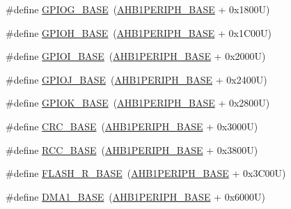 \begin{DoxyCompactItemize}
\item 
\#define \hyperlink{group___peripheral__memory__map_ga5d8ca4020f2e8c00bde974e8e7c13cfe}{G\+P\+I\+O\+G\+\_\+\+B\+A\+SE}~(\hyperlink{group___peripheral__memory__map_ga811a9a4ca17f0a50354a9169541d56c4}{A\+H\+B1\+P\+E\+R\+I\+P\+H\+\_\+\+B\+A\+SE} + 0x1800\+U)
\item 
\#define \hyperlink{group___peripheral__memory__map_gaee4716389f3a1c727495375b76645608}{G\+P\+I\+O\+H\+\_\+\+B\+A\+SE}~(\hyperlink{group___peripheral__memory__map_ga811a9a4ca17f0a50354a9169541d56c4}{A\+H\+B1\+P\+E\+R\+I\+P\+H\+\_\+\+B\+A\+SE} + 0x1\+C00\+U)
\item 
\#define \hyperlink{group___peripheral__memory__map_ga50acf918c2e1c4597d5ccfe25eb3ad3d}{G\+P\+I\+O\+I\+\_\+\+B\+A\+SE}~(\hyperlink{group___peripheral__memory__map_ga811a9a4ca17f0a50354a9169541d56c4}{A\+H\+B1\+P\+E\+R\+I\+P\+H\+\_\+\+B\+A\+SE} + 0x2000\+U)
\item 
\#define \hyperlink{group___peripheral__memory__map_ga73f5a4e42f41acc614ee82c8ebfe0b85}{G\+P\+I\+O\+J\+\_\+\+B\+A\+SE}~(\hyperlink{group___peripheral__memory__map_ga811a9a4ca17f0a50354a9169541d56c4}{A\+H\+B1\+P\+E\+R\+I\+P\+H\+\_\+\+B\+A\+SE} + 0x2400\+U)
\item 
\#define \hyperlink{group___peripheral__memory__map_ga46d3f8cd7c045b5e13cd7395b8e936e5}{G\+P\+I\+O\+K\+\_\+\+B\+A\+SE}~(\hyperlink{group___peripheral__memory__map_ga811a9a4ca17f0a50354a9169541d56c4}{A\+H\+B1\+P\+E\+R\+I\+P\+H\+\_\+\+B\+A\+SE} + 0x2800\+U)
\item 
\#define \hyperlink{group___peripheral__memory__map_ga656a447589e785594cbf2f45c835ad7e}{C\+R\+C\+\_\+\+B\+A\+SE}~(\hyperlink{group___peripheral__memory__map_ga811a9a4ca17f0a50354a9169541d56c4}{A\+H\+B1\+P\+E\+R\+I\+P\+H\+\_\+\+B\+A\+SE} + 0x3000\+U)
\item 
\#define \hyperlink{group___peripheral__memory__map_ga0e681b03f364532055d88f63fec0d99d}{R\+C\+C\+\_\+\+B\+A\+SE}~(\hyperlink{group___peripheral__memory__map_ga811a9a4ca17f0a50354a9169541d56c4}{A\+H\+B1\+P\+E\+R\+I\+P\+H\+\_\+\+B\+A\+SE} + 0x3800\+U)
\item 
\#define \hyperlink{group___peripheral__memory__map_ga8e21f4845015730c5731763169ec0e9b}{F\+L\+A\+S\+H\+\_\+\+R\+\_\+\+B\+A\+SE}~(\hyperlink{group___peripheral__memory__map_ga811a9a4ca17f0a50354a9169541d56c4}{A\+H\+B1\+P\+E\+R\+I\+P\+H\+\_\+\+B\+A\+SE} + 0x3\+C00\+U)
\item 
\#define \hyperlink{group___peripheral__memory__map_gab2d8a917a0e4ea99a22ac6ebf279bc72}{D\+M\+A1\+\_\+\+B\+A\+SE}~(\hyperlink{group___peripheral__memory__map_ga811a9a4ca17f0a50354a9169541d56c4}{A\+H\+B1\+P\+E\+R\+I\+P\+H\+\_\+\+B\+A\+SE} + 0x6000\+U)

\end{DoxyCompactItemize}
